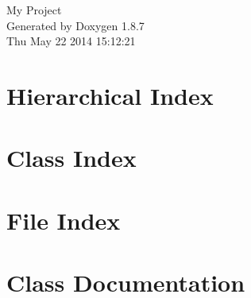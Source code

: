 \documentclass[twoside]{book}
\newcommand{\+}{\discretionary{\mbox{\scriptsize$\hookleftarrow$}}{}{}}
\newcommand{\clearemptydoublepage}{%
  \newpage{\pagestyle{empty}\cleardoublepage}%
}
\begin{document}
\hypersetup{pageanchor=false,
             bookmarks=true,
             bookmarksnumbered=true,
             pdfencoding=unicode
            }
\begin{titlepage}
\vspace*{7cm}
\begin{center}%
{\Large My Project }\\
\vspace*{1cm}
{\large Generated by Doxygen 1.8.7}\\
\vspace*{0.5cm}
{\small Thu May 22 2014 15:12:21}\\
\end{center}
\end{titlepage}
\clearemptydoublepage
\tableofcontents
\clearemptydoublepage
{}
\hypersetup{pageanchor=true}

\chapter{Hierarchical Index}

\chapter{Class Index}

\chapter{File Index}

\chapter{Class Documentation}

































\end{document}
